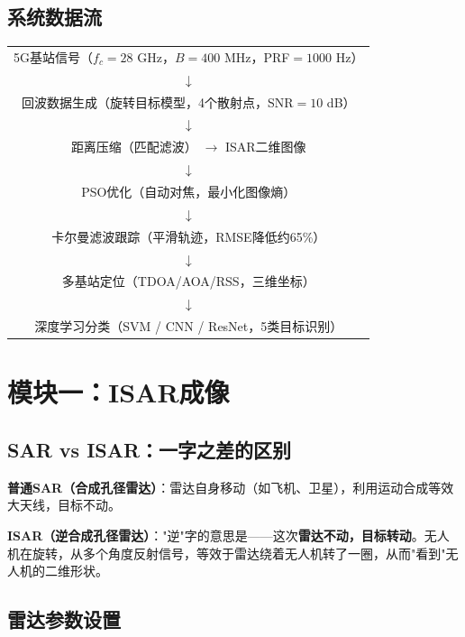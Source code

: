 \documentclass[12pt, a4paper]{article}
\begin{document}
\subsection{系统数据流}

\begin{center}
\begin{tabular}{c}
5G基站信号（$f_c=28$ GHz，$B=400$ MHz，PRF$=1000$ Hz）\\
$\downarrow$\\
回波数据生成（旋转目标模型，4个散射点，SNR$=10$ dB）\\
$\downarrow$\\
距离压缩（匹配滤波） $\longrightarrow$ ISAR二维图像\\
$\downarrow$\\
PSO优化（自动对焦，最小化图像熵）\\
$\downarrow$\\
卡尔曼滤波跟踪（平滑轨迹，RMSE降低约65\%）\\
$\downarrow$\\
多基站定位（TDOA/AOA/RSS，三维坐标）\\
$\downarrow$\\
深度学习分类（SVM / CNN / ResNet，5类目标识别）
\end{tabular}
\end{center}

\section{模块一：ISAR成像}

\subsection{SAR vs ISAR：一字之差的区别}

\begin{intubox}[直觉理解]
\textbf{普通SAR（合成孔径雷达）}：雷达自身移动（如飞机、卫星），利用运动合成等效大天线，目标不动。

\textbf{ISAR（逆合成孔径雷达）}："逆"字的意思是——这次\textbf{雷达不动，目标转动}。无人机在旋转，从多个角度反射信号，等效于雷达绕着无人机转了一圈，从而"看到"无人机的二维形状。
\end{intubox}

\subsection{雷达参数设置}
\end{document}

